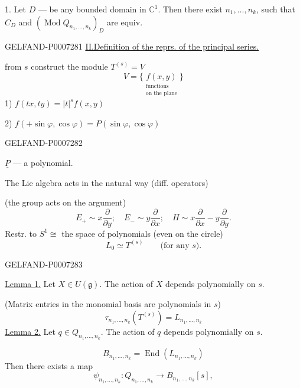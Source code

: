  1. Let \(D\) --- be any bounded domain in \(\mathbb C^1\).
Then there exist \(n_1,\ldots,n_k\), such that \(C_D\) and
\((\operatorname{Mod} Q_{n_1,\ldots,n_k})_D\) are equiv.


\begin{GelfandAdjacentEvidence}{GELFAND-P000728}{1}
\underline{II.}\quad \underline{Definition of the reprs. of the principal series.}

from \(s\) construct the module \(T^{(s)}=V\)
\[
V=\{\underset{\substack{\text{functions}\\\text{on the plane}}}{f(x,y)}\}
\]
1) \(f(tx,ty)=|t|^sf(x,y)\)

2) \(f(+\sin\varphi,\cos\varphi)=P(\sin\varphi,\cos\varphi)\)
\end{GelfandAdjacentEvidence}
\begin{GelfandAdjacentEvidence}{GELFAND-P000728}{2}


\(\underline{P}\) --- a polynomial.

The Lie algebra acts in the natural way (diff. operators)

(the group acts on the argument)
\[
E_+\sim x\frac{\partial}{\partial y};\quad
E_-\sim y\frac{\partial}{\partial x};\quad
H\sim x\frac{\partial}{\partial x}-y\frac{\partial}{\partial y}.
\]
Restr. to \(S^1\cong{}\) the space of polynomials (even on the circle)
\[
L_0\simeq T^{(s)}\qquad\text{(for any }s\text{).}
\]
\end{GelfandAdjacentEvidence}
\begin{GelfandAdjacentEvidence}{GELFAND-P000728}{3}


\underline{Lemma 1.} Let \(X\in U(\mathfrak g)\). The action of \(X\) depends polynomially on \(s\).

(Matrix entries in the monomial basis are polynomials in \(s\))
\[
\tau_{n_1,\ldots,n_k}(T^{(s)})=L_{n_1,\ldots,n_k}
\]
\underline{Lemma 2.} Let \(q\in Q_{n_1,\ldots,n_k}\). The action of \(q\) depends polynomially on \(s\).

\quad {}
\[
B_{n_1,\ldots,n_k}=\operatorname{End}(L_{n_1,\ldots,n_k})
\]
Then there exists a map
\[
\psi_{n_1,\ldots,n_k}:
Q_{n_1,\ldots,n_k}\longrightarrow B_{n_1,\ldots,n_k}[s],
\]
\end{GelfandAdjacentEvidence}
